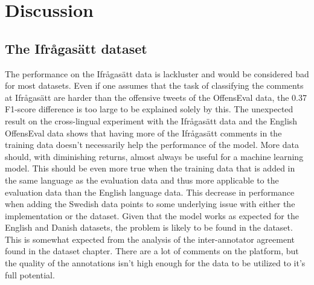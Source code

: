 \documentclass[nofilelist]{cslthse-msc}
\begin{document}

\chapter{Discussion}


\section{The Ifrågasätt dataset}

The performance on the Ifrågasätt data is lackluster and would be considered bad for most datasets. Even if one assumes that the task of classifying the comments at Ifrågasätt are harder than the offensive tweets of the OffensEval data, the 0.37 F1-score difference is too large to be explained solely by this. The unexpected result on the cross-lingual experiment with the Ifrågasätt data and the English OffensEval data shows that having more of the Ifrågasätt comments in the training data doesn't necessarily help the performance of the model. 
More data should, with diminishing returns, almost always be useful for a machine learning model. This should be even more true when the training data that is added in the same language as the evaluation data and thus more applicable to the evaluation data than the English language data. This decrease in performance when adding the Swedish data points to some underlying issue with either the implementation or the dataset. Given that the model works as expected for the English and Danish datasets, the problem is likely to be found in the dataset. This is somewhat expected from the analysis of the inter-annotator agreement found in the dataset chapter. There are a lot of comments on the platform, but the quality of the annotations isn't high enough for the data to be utilized to it's full potential. 
\end{document}
